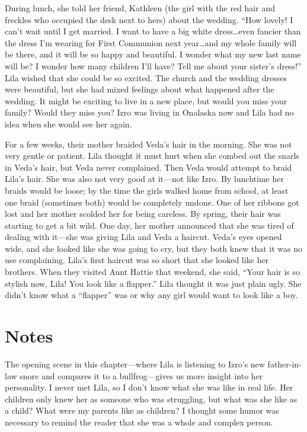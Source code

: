 \documentclass[
  letterpaper,
]{book}
\begin{document}
During lunch, she told her friend, Kathleen (the girl with the red hair
and freckles who occupied the desk next to hers) about the wedding.
``How lovely! I can't wait until I get married. I want to have a big
white dress\ldots even fancier than the dress I'm wearing for First
Communion next year\ldots and my whole family will be there, and it will
be so happy and beautiful. I wonder what my new last name will be? I
wonder how many children I'll have? Tell me about your sister's dress!''
Lila wished that she could be so excited. The church and the wedding
dresses were beautiful, but she had mixed feelings about what happened
after the wedding. It might be exciting to live in a new place, but
would you miss your family? Would they miss you? Izro was living in
Onalaska now and Lila had no idea when she would see her again.

For a few weeks, their mother braided Veda's hair in the morning. She
was not very gentle or patient. Lila thought it must hurt when she
combed out the snarls in Veda's hair, but Veda never complained. Then
Veda would attempt to braid Lila's hair. She was also not very good at
it---not like Izro. By lunchtime her braids would be loose; by the time
the girls walked home from school, at least one braid (sometimes both)
would be completely undone. One of her ribbons got lost and her mother
scolded her for being careless. By spring, their hair was starting to
get a bit wild. One day, her mother announced that she was tired of
dealing with it---she was giving Lila and Veda a haircut. Veda's eyes
opened wide, and she looked like she was going to cry, but they both
knew that it was no use complaining. Lila's first haircut was so short
that she looked like her brothers. When they visited Aunt Hattie that
weekend, she said, ``Your hair is so stylish now, Lila! You look like a
flapper.'' Lila thought it was just plain ugly. She didn't know what a
``flapper'' was or why any girl would want to look like a boy.

\section{Notes}\label{notes-7}

The opening scene in this chapter---where Lila is listening to Izro's
new father-in-law snore and compares it to a bullfrog---gives us more
insight into her personality. I never met Lila, so I don't know what she
was like in real life. Her children only knew her as someone who was
struggling, but what was she like as a child? What were my parents like
as children? I thought some humor was necessary to remind the reader
that she was a whole and complex person.
\end{document}

